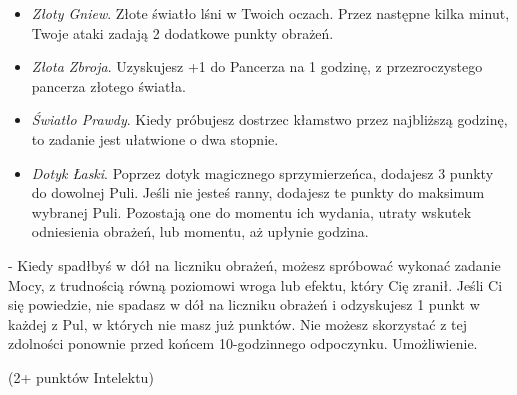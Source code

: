 \begin{itemize}
\item \textit{Złoty Gniew}. Złote światło lśni w Twoich oczach. Przez następne kilka minut, Twoje ataki zadają 2 dodatkowe punkty obrażeń.
\item \textit{Złota Zbroja}. Uzyskujesz +1 do Pancerza na 1 godzinę, z przezroczystego pancerza złotego światła.
\item \textit{Światło Prawdy}. Kiedy próbujesz dostrzec kłamstwo przez najbliższą godzinę, to zadanie jest ułatwione o dwa stopnie.
\item \textit{Dotyk Łaski}. Poprzez dotyk magicznego sprzymierzeńca, dodajesz 3 punkty do dowolnej Puli. Jeśli nie jesteś ranny, dodajesz te punkty do maksimum wybranej Puli. Pozostają one do momentu ich wydania, utraty wskutek odniesienia obrażeń, lub momentu, aż upłynie godzina.
\end{itemize} 

 - Kiedy spadłbyś w dół na liczniku obrażeń, możesz spróbować wykonać zadanie Mocy, z trudnością równą poziomowi wroga lub efektu, który Cię zranił. Jeśli Ci się powiedzie, nie spadasz w dół na liczniku obrażeń i odzyskujesz 1 punkt w każdej z Pul, w których nie masz już punktów. Nie możesz skorzystać z tej zdolności ponownie przed końcem 10-godzinnego odpoczynku. Umożliwienie.

 (2+ punktów Intelektu)
